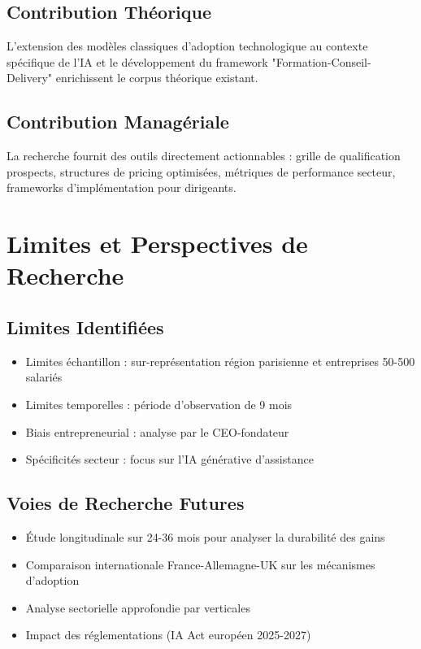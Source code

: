 \documentclass[12pt,a4paper]{report}
\begin{document}
\subsection{Contribution Théorique}
L'extension des modèles classiques d'adoption technologique au contexte spécifique de l'IA et le développement du framework "Formation-Conseil-Delivery" enrichissent le corpus théorique existant.

\subsection{Contribution Managériale}
La recherche fournit des outils directement actionnables : grille de qualification prospects, structures de pricing optimisées, métriques de performance secteur, frameworks d'implémentation pour dirigeants.

\section{Limites et Perspectives de Recherche}

\subsection{Limites Identifiées}
\begin{itemize}
\item Limites échantillon : sur-représentation région parisienne et entreprises 50-500 salariés
\item Limites temporelles : période d'observation de 9 mois
\item Biais entrepreneurial : analyse par le CEO-fondateur
\item Spécificités secteur : focus sur l'IA générative d'assistance
\end{itemize}

\subsection{Voies de Recherche Futures}
\begin{itemize}
\item Étude longitudinale sur 24-36 mois pour analyser la durabilité des gains
\item Comparaison internationale France-Allemagne-UK sur les mécanismes d'adoption
\item Analyse sectorielle approfondie par verticales
\item Impact des réglementations (IA Act européen 2025-2027)
\end{itemize}
\end{document}

